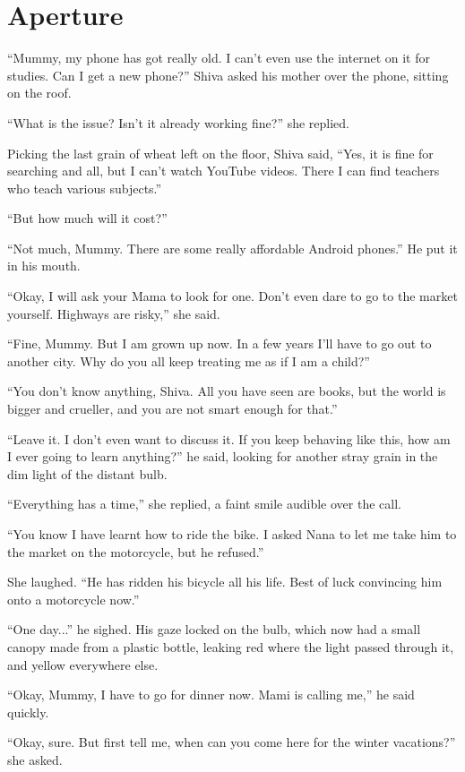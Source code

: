 \chapter{Aperture}

``Mummy, my phone has got really old. I can't even use the internet on it for studies. Can I get a new phone?'' Shiva asked his mother over the phone, sitting on the roof.

``What is the issue? Isn't it already working fine?'' she replied.

Picking the last grain of wheat left on the floor, Shiva said, ``Yes, it is fine for searching and all, but I can't watch YouTube videos. There I can find teachers who teach various subjects.''

``But how much will it cost?''

``Not much, Mummy. There are some really affordable Android phones.'' He put it in his mouth.

``Okay, I will ask your Mama to look for one. Don't even dare to go to the market yourself. Highways are risky,'' she said.

``Fine, Mummy. But I am grown up now. In a few years I'll have to go out to another city. Why do you all keep treating me as if I am a child?''

``You don't know anything, Shiva. All you have seen are books, but the world is bigger and crueller, and you are not smart enough for that.''

``Leave it. I don't even want to discuss it. If you keep behaving like this, how am I ever going to learn anything?'' he said, looking for another stray grain in the dim light of the distant bulb.

``Everything has a time,'' she replied, a faint smile audible over the call.

``You know I have learnt how to ride the bike. I asked Nana to let me take him to the market on the motorcycle, but he refused.''

She laughed. ``He has ridden his bicycle all his life. Best of luck convincing him onto a motorcycle now.''

``One day...'' he sighed. His gaze locked on the bulb, which now had a small canopy made from a plastic bottle, leaking red where the light passed through it, and yellow everywhere else.

``Okay, Mummy, I have to go for dinner now. Mami is calling me,'' he said quickly.

``Okay, sure. But first tell me, when can you come here for the winter vacations?'' she asked.

